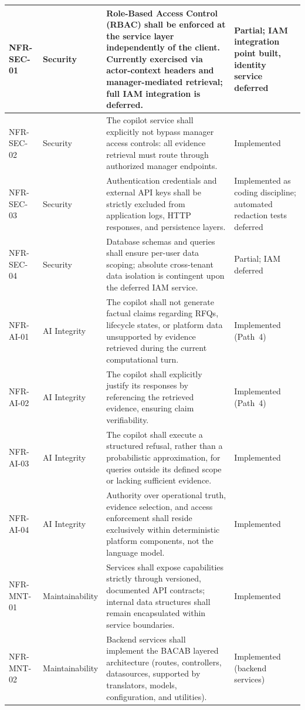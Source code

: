 \begin{longtable}{|p{2.2cm}|p{2.7cm}|>{\RaggedRight\arraybackslash}p{5.8cm}|p{2.7cm}|}
NFR-SEC-01 & Security & Role-Based Access Control (RBAC) shall be enforced at the service layer independently of the client. Currently exercised via actor-context headers and manager-mediated retrieval; full IAM integration is deferred. & Partial; IAM integration point built, identity service deferred \\ \hline
NFR-SEC-02 & Security & The copilot service shall explicitly not bypass manager access controls: all evidence retrieval must route through authorized manager endpoints. & Implemented \\ \hline
NFR-SEC-03 & Security & Authentication credentials and external API keys shall be strictly excluded from application logs, HTTP responses, and persistence layers. & Implemented as coding discipline; automated redaction tests deferred \\ \hline
NFR-SEC-04 & Security & Database schemas and queries shall ensure per-user data scoping; absolute cross-tenant data isolation is contingent upon the deferred IAM service. & Partial; IAM deferred \\ \hline
NFR-AI-01 & AI Integrity & The copilot shall not generate factual claims regarding RFQs, lifecycle states, or platform data unsupported by evidence retrieved during the current computational turn. & Implemented (Path~4) \\ \hline
NFR-AI-02 & AI Integrity & The copilot shall explicitly justify its responses by referencing the retrieved evidence, ensuring claim verifiability. & Implemented (Path~4) \\ \hline
NFR-AI-03 & AI Integrity & The copilot shall execute a structured refusal, rather than a probabilistic approximation, for queries outside its defined scope or lacking sufficient evidence. & Implemented \\ \hline
NFR-AI-04 & AI Integrity & Authority over operational truth, evidence selection, and access enforcement shall reside exclusively within deterministic platform components, not the language model. & Implemented \\ \hline
NFR-MNT-01 & Maintainability & Services shall expose capabilities strictly through versioned, documented API contracts; internal data structures shall remain encapsulated within service boundaries. & Implemented \\ \hline
NFR-MNT-02 & Maintainability & Backend services shall implement the BACAB layered architecture (routes, controllers, datasources, supported by translators, models, configuration, and utilities). & Implemented (backend services) \\ \hline

\end{longtable}
